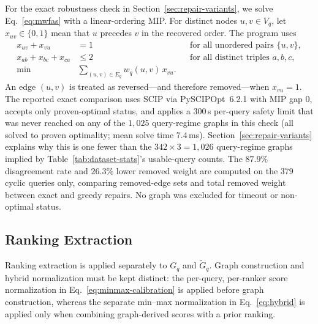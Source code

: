 \documentclass[manuscript,anonymous,review]{acmart}
\begin{document}
For the exact robustness check in Section~\ref{sec:repair-variants}, we solve
Eq.~\eqref{eq:mwfas} with a linear-ordering MIP. For distinct nodes $u,v\in V_q$,
let $x_{uv}\in\{0,1\}$ mean that $u$ precedes $v$ in the recovered order. The
program uses
\begin{align}
  x_{uv}+x_{vu}&=1
  &&\text{for all unordered pairs }\{u,v\},
  \label{eq:ilp-anti}\\
  x_{ab}+x_{bc}+x_{ca}&\le 2
  &&\text{for all distinct triples }a,b,c,
  \label{eq:ilp-trans}\\
  \min &\sum_{(u,v)\in E_q} w_q(u,v)\,x_{vu}.
  \label{eq:ilp-obj}
\end{align}
An edge $(u,v)$ is treated as reversed---and therefore removed---when
$x_{vu}=1$. The reported exact comparison uses SCIP via PySCIPOpt~6.2.1 with
MIP gap $0$, accepts only proven-optimal status, and applies a $300$\,s
per-query safety limit that was never reached on any of the $1{,}025$
query-regime graphs in this check (all solved to proven optimality; mean
solve time $7.4$\,ms). Section~\ref{sec:repair-variants} explains why this is
one fewer than the $342\times3=1{,}026$ query-regime graphs implied by
Table~\ref{tab:dataset-stats}'s usable-query counts. The $87.9\%$
disagreement rate and $26.3\%$ lower removed weight are computed on
the $379$ cyclic queries only, comparing removed-edge sets and total removed
weight between exact and greedy repairs. No graph was excluded for timeout or
non-optimal status.

\subsection{Ranking Extraction}
\label{sec:extraction}

Ranking extraction is applied separately to $G_q$ and $\widetilde G_q$. Graph
construction and hybrid normalization must be kept distinct: the per-query,
per-ranker score normalization in Eq.~\eqref{eq:minmax-calibration} is
applied before graph construction, whereas the separate min--max
normalization in Eq.~\eqref{eq:hybrid} is applied only when combining
graph-derived scores with a prior ranking.
\end{document}
